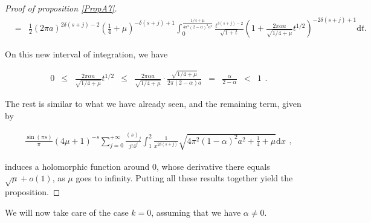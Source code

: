 \documentclass{jams-l}
\theoremstyle{definition}
\theoremstyle{remark}
\numberwithin{equation}{section}
\begin{document}
\begin{proof}[Proof of proposition \ref{PropA7}]
\[\begin{array}{lll}
                            & \scriptstyle = & \scriptstyle \frac{1}{2} \left( 2 \pi a \right)^{2 \delta \left( s + j \right) - 2} \left( \frac{1}{4} + \mu \right)^{- \delta \left( s + j \right) + 1} \int_0^{\frac{1/4 + \mu}{4 \pi^2 \left( 2 - \alpha \right)^2 a^2}} \frac{t^{\delta \left( s + j \right) - 2}}{\sqrt{1 + t}} \left( 1 + \frac{2 \pi \alpha a}{\sqrt{1/4 + \mu}} t^{1/2} \right)^{- 2 \delta \left( s + j \right) + 1} \mathrm{d}t.
                        \end{array} \]
                    
                    \noindent On this new interval of integration, we have
                    
                    \[ \begin{array}{lllllllll}
                            0 & \leqslant & \frac{2 \pi \alpha a}{\sqrt{1/4 + \mu}} t^{1/2} & \leqslant & \frac{2 \pi \alpha a}{\sqrt{1/4 + \mu}} \cdot \frac{\sqrt{1/4 + \mu}}{2 \pi \left( 2 - \alpha \right) a} & = & \frac{\alpha}{2 - \alpha} & < & 1
                        \end{array} . \]
                    
                    \noindent The rest is similar to what we have already seen, and the remaining term, given by
                    
                    \[ \begin{array}{lll}
                            \frac{\sin \left( \pi s \right)}{\pi} \left( 4 \mu + 1 \right)^{-s} \sum\limits_{j = 0}^{+ \infty}  \frac{\left( s \right)_j}{j! 4^j} \int_1^2 \frac{1}{x^{2 \delta \left( s + j \right)}} \sqrt{4 \pi^2 \left( 1 - \alpha \right)^2 a^2 + \frac{1}{4} + \mu} \mathrm{d}x
                        \end{array} , \]
                    
                    \noindent induces a holomorphic function around $0$, whose derivative there equals $\sqrt{\mu} + o \left( 1 \right)$, as $\mu$ goes to infinity. Putting all these results together yield the proposition.
            
            \end{proof}
            
            We will now take care of the case $k = 0$, assuming that we have $\alpha \neq 0$.
            
\end{document}
